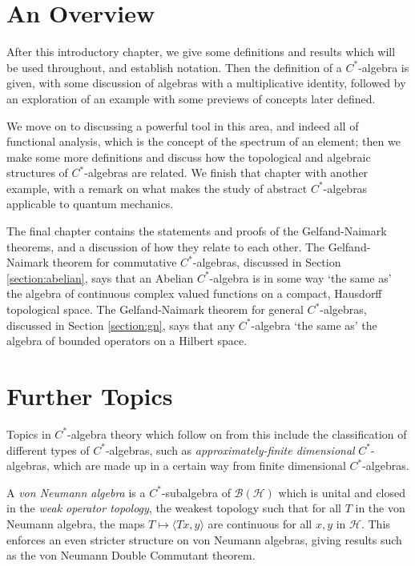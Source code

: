 \documentclass[11pt,a4paper]{report}
\theoremstyle{plain}
\theoremstyle{definition}
\newcommand{\1}{\mathbbm{1}}
\renewcommand{\H}{\mathcal{H}}
\newcommand{\B}{\mathcal{B}}
\newcommand{\BH}{\mathcal{\B(\H)}}
\begin{document}
\section{An Overview}

After this introductory chapter, we give some definitions and results which will 
be used throughout, and establish notation. Then the definition of a 
$C^\ast$-algebra is given, with some discussion of algebras with a 
multiplicative identity, followed by an exploration of an example with some 
previews of concepts later defined. 

We move on to discussing a powerful tool in 
this area, and indeed all of functional analysis, which is the concept of the 
spectrum of an element; then we make some more definitions and discuss how the 
topological and algebraic structures of $C^\ast$-algebras are related. 
We finish that chapter with another example, with a remark on what makes the 
study of abstract $C^\ast$-algebras applicable to quantum mechanics. 

The final chapter contains the statements and proofs of the Gelfand-Naimark 
theorems, and a discussion of how they relate to each other. The Gelfand-Naimark 
theorem for commutative $C^\ast$-algebras, discussed in Section 
\ref{section:abelian}, says that an Abelian $C^\ast$-algebra is in some way `the 
same as' the algebra of continuous complex valued functions on a compact, 
Hausdorff topological space. The Gelfand-Naimark theorem for general 
$C^\ast$-algebras, discussed in Section \ref{section:gn}, says that any 
$C^\ast$-algebra `the same as' the algebra of bounded operators on a Hilbert 
space.





\section{Further Topics}
Topics in $C^\ast$-algebra theory which follow on from this include the 
classification of different types of $C^\ast$-algebras, such as 
\emph{approximately-finite dimensional} $C^\ast$-algebras, which are made up in 
a certain way from finite dimensional $C^\ast$-algebras.


A \emph{von Neumann algebra }is a $C^\ast$-subalgebra of $\BH$ which is unital 
and closed in the \emph{weak operator topology}, the weakest topology such that
for all $T$ in the von Neumann algebra, the maps $T\mapsto\langle Tx,y\rangle$ 
are continuous for all $x,y$ in $\H$. This enforces an even stricter structure 
on von Neumann algebras, giving results such as the von Neumann Double 
Commutant theorem.
\end{document}
